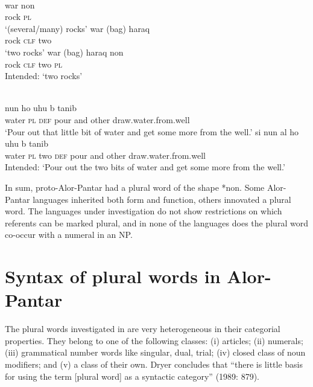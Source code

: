 \ea%
\label{ex:9:10}
 \\
\ea
\gll  war non\\
   rock \textsc{pl}  \\
\glt `(several/many) rocks'
\ex
\gll war (bag) {haraq}\\
 rock \textsc{clf} two  \\
\glt   `two rocks'
\ex
\gll *war (bag) haraq non \\
 rock \textsc{clf} two \textsc{pl} \\
 \glt Intended: `two rocks'
\z
\z



\ea%
\label{ex:9:11}
 \\
\ea
{} nun ho {\textglotstop}uhu{\textltailn} {\textepsilon}  b{\textepsilon}{\ng} tanib \\
   water \textsc{pl} \textsc{def} pour and other draw.water.from.well  \\
\glt `Pour out that little bit of water and get some more from the well.'
\ex
\gll *s{\textepsilon}{i} nun al{\textopeno} ho {\textglotstop}uhu{\textltailn} {\textepsilon} b{\textepsilon}{\ng} tanib \\
   water \textsc{pl} two \textsc{def} pour and other draw.water.from.well  \\
\glt  Intended: `Pour out the two bits of water and get some more from the well.'
\z
\z

In sum, proto-Alor-Pantar had a plural word of the shape *non. Some Alor-Pantar languages inherited both form and function, others innovated a plural word. The languages under investigation do not show restrictions on which referents can be marked plural, and in none of the languages does the plural word co-occur with a numeral in an NP.

\section{Syntax of plural words in Alor-Pantar}  %

\label{sec:9:3}
The plural words investigated in \citet{Dryer1989} are very heterogeneous in their categorial properties. They belong to one of the following classes: (i) articles; (ii) numerals; (iii) grammatical number words like singular, dual, trial; (iv) closed class of noun modifiers; and (v) a class of their own. Dryer concludes that ``there is little basis for using the term [plural word] as a syntactic category'' (1989: 879).

